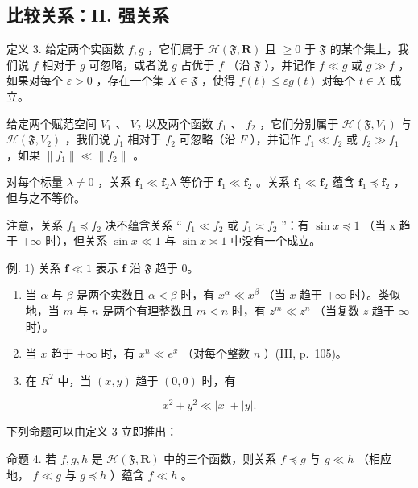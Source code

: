 \subsection{比较关系：II. 强关系}

定义 3. 给定两个实函数 \(f, g\) ，它们属于 \(\mathcal{H}(\mathfrak{F}, \mathbf{R})\) 且 \(\geqslant 0\) 于 \(\mathfrak{F}\) 的某个集上，我们说 \(f\) 相对于 \(g\) 可忽略，或者说 \(g\) 占优于 \(f\) （沿 \(\mathfrak{F}\) ），并记作 \(f \ll g\) 或 \(g \gg f\) ，如果对每个 \(\varepsilon > 0\) ，存在一个集 \(X \in \mathfrak{F}\) ，使得 \(f(t) \leqslant \varepsilon g(t)\) 对每个 \(t \in X\) 成立。

给定两个赋范空间 \(V_{1}\) 、 \(V_{2}\) 以及两个函数 \(f_{1}\) 、 \(f_{2}\) ，它们分别属于 \(\mathcal{H}(\mathfrak{F}, V_{1})\) 与 \(\mathcal{H}(\mathfrak{F}, V_{2})\) ，我们说 \(f_{1}\) 相对于 \(f_{2}\) 可忽略（沿 \(F\) ），并记作 \(f_{1} \ll f_{2}\) 或 \(f_{2} \gg f_{1}\) ，如果 \(\|f_{1}\| \ll \|f_{2}\|\) 。

对每个标量 \(\lambda \neq 0\) ，关系 \(\mathbf{f}_1 \ll \mathbf{f}_2\lambda\) 等价于 \(\mathbf{f}_1 \ll \mathbf{f}_2\) 。关系 \(\mathbf{f}_1 \ll \mathbf{f}_2\) 蕴含 \(\mathbf{f}_1 \preccurlyeq \mathbf{f}_2\) ，但与之不等价。

注意，关系 \(f_{1} \preccurlyeq f_{2}\) 决不蕴含关系 “ \(f_{1} \ll f_{2}\) 或 \(f_{1} \asymp f_{2}\) ”：有 \(\sin x \preccurlyeq 1\) （当 x 趋于 \(+\infty\) 时），但关系 \(\sin x \ll 1\) 与 \(\sin x \asymp 1\) 中没有一个成立。

例. 1) 关系 \(\mathbf{f} \ll 1\) 表示 \(\mathbf{f}\) 沿 \(\mathfrak{F}\) 趋于 0。

\begin{enumerate}
\def\labelenumi{\arabic{enumi})}
\setcounter{enumi}{1}
\item
  当 \(\alpha\) 与 \(\beta\) 是两个实数且 \(\alpha < \beta\) 时，有 \(x^{\alpha} \ll x^{\beta}\) （当 \(x\) 趋于 \(+\infty\) 时）。类似地，当 \(m\) 与 \(n\) 是两个有理整数且 \(m < n\) 时，有 \(z^{m} \ll z^{n}\) （当复数 \(z\) 趋于 \(\infty\) 时）。
\item
  当 \(x\) 趋于 \(+\infty\) 时，有 \(x^n \ll e^x\) （对每个整数 \(n\) ）(III, p.~105)。
\item
  在 \(R^{2}\) 中，当 \((x, y)\) 趋于 \((0, 0)\) 时，有
\end{enumerate}

\[
x ^ {2} + y ^ {2} \ll | x | + | y |.
\]

下列命题可以由定义 3 立即推出：

命题 4. 若 \(f, g, h\) 是 \(\mathcal{H}(\mathfrak{F}, \mathbf{R})\) 中的三个函数，则关系 \(f \preccurlyeq g\) 与 \(g \ll h\) （相应地， \(f \ll g\) 与 \(g \preccurlyeq h\) ）蕴含 \(f \ll h\) 。

